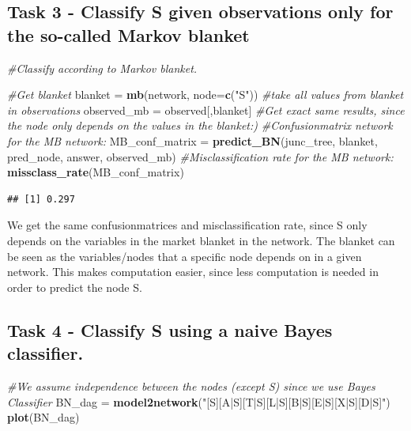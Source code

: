 \documentclass[]{article}
\newenvironment{Shaded}{\begin{snugshade}}{\end{snugshade}}
\newcommand{\CommentTok}[1]{\textcolor[rgb]{0.56,0.35,0.01}{\textit{#1}}}
\newcommand{\DataTypeTok}[1]{\textcolor[rgb]{0.13,0.29,0.53}{#1}}
\newcommand{\KeywordTok}[1]{\textcolor[rgb]{0.13,0.29,0.53}{\textbf{#1}}}
\newcommand{\NormalTok}[1]{#1}
\newcommand{\StringTok}[1]{\textcolor[rgb]{0.31,0.60,0.02}{#1}}
\begin{document}
\hypertarget{task-3---classify-s-given-observations-only-for-the-so-called-markov-blanket}{%
\subsection{Task 3 - Classify S given observations only for the
so-called Markov
blanket}\label{task-3---classify-s-given-observations-only-for-the-so-called-markov-blanket}}

\begin{Shaded}
\begin{Highlighting}[]
\CommentTok{#Classify according to Markov blanket. }

\CommentTok{#Get blanket }
\NormalTok{blanket =}\StringTok{ }\KeywordTok{mb}\NormalTok{(network, }\DataTypeTok{node=}\KeywordTok{c}\NormalTok{(}\StringTok{"S"}\NormalTok{))}
\CommentTok{#take all values from blanket in observations}
\NormalTok{observed_mb =}\StringTok{ }\NormalTok{observed[,blanket] }
\CommentTok{#Get exact same results, since the node only depends on the values in the blanket:)}
\CommentTok{#Confusionmatrix network for the MB network:}
\NormalTok{MB_conf_matrix =}\StringTok{ }\KeywordTok{predict_BN}\NormalTok{(junc_tree, blanket, pred_node, answer, observed_mb)}
\CommentTok{#Misclassification rate for the MB network:}
\KeywordTok{missclass_rate}\NormalTok{(MB_conf_matrix)}
\end{Highlighting}
\end{Shaded}

\begin{verbatim}
## [1] 0.297
\end{verbatim}

We get the same confusionmatrices and misclassification rate, since S
only depends on the variables in the market blanket in the network. The
blanket can be seen as the variables/nodes that a specific node depends
on in a given network. This makes computation easier, since less
computation is needed in order to predict the node S.

\hypertarget{task-4---classify-s-using-a-naive-bayes-classifier.}{%
\subsection{Task 4 - Classify S using a naive Bayes
classifier.}\label{task-4---classify-s-using-a-naive-bayes-classifier.}}

\begin{Shaded}
\begin{Highlighting}[]
\CommentTok{#We assume independence between the nodes (except S) since we use Bayes Classifier}
\NormalTok{BN_dag =}\StringTok{ }\KeywordTok{model2network}\NormalTok{(}\StringTok{"[S][A|S][T|S][L|S][B|S][E|S][X|S][D|S]"}\NormalTok{)}
\KeywordTok{plot}\NormalTok{(BN_dag)}
\end{Highlighting}
\end{Shaded}
\end{document}
